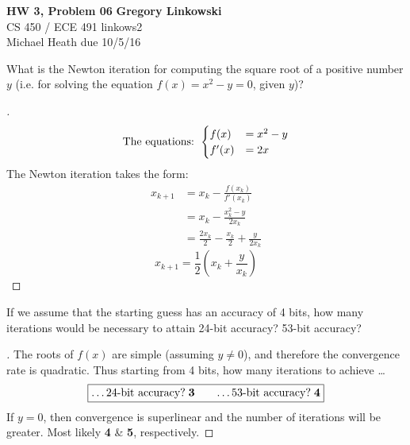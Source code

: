 \documentclass[12pt]{article}
\newenvironment{exercise}[2][Exercise]{\begin{trivlist}
\item[\hskip \labelsep {\bfseries #1}\hskip \labelsep {\bfseries #2.}]}{\end{trivlist}}
\begin{document}
\noindent
\large\textbf{HW 3, Problem 06} \hfill \textbf{Gregory Linkowski} \\
\normalsize CS 450 / ECE 491 \hfill linkows2 \\
Michael Heath \hfill due 10/5/16 \\



\begin{exercise}{1}
	What is the Newton iteration for computing the square root of a positive number $y$ (i.e. for solving the equation $f(x)=x^2 -  y=0$, given $y$)?
\end{exercise}
\begin{proof}[]
	\[ \textnormal{The equations:  }
	\begin{cases}
		f(x) &= x^2 - y \\
		f'(x) &= 2x
	\end{cases} \]
	The Newton iteration takes the form:
	\begin{align*}
		x_{k+1} &= x_k - \frac{f(x_k)}{f'(x_k)} \\
		&= x_k - \frac{x_k^2 - y}{2 x_k} \\
		&= \frac{2x_k}{2} - \frac{x_k}{2} + \frac{y}{2x_k}
	\end{align*}
	\[ \boxed{x_{k+1} = \frac{1}{2}\left( x_k + \frac{y}{x_k} \right)} \]
\end{proof}

\begin{exercise}{2}
	If we assume that the starting guess has an accuracy of 4 bits, how many iterations would be necessary to attain 24-bit accuracy? 53-bit accuracy?
\end{exercise}
\begin{proof}[]
	The roots of $f(x)$ are simple (assuming $y \neq 0$), and therefore the convergence rate is quadratic. Thus starting from 4 bits, how many iterations to achieve \dots \\
	\[\boxed{ \textnormal{\dots 24-bit accuracy?} \; \bm{3} \qquad
			\textnormal{\hfill \dots 53-bit accuracy?} \; \bm{4} } \]
	If $y = 0$, then convergence is superlinear and the number of iterations will be greater. Most likely \textbf{4} \& \textbf{5}, respectively.
\end{proof}
\end{document}
